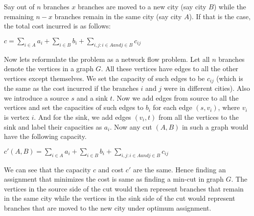 Say out of $n$ branches $x$ branches are moved to a new city (say city $B$) while the remaining $n-x$ branches remain in the same city (say city $A$). If that is the case, the total cost incurred is as follows:

\begin{center}
$c = \sum\limits_{i \in A} a_i + \sum\limits_{i \in B} b_i + \sum\limits_{i, j: i \in A and j \in B} c_{ij} $
\end{center}


Now lets reformulate the problem as a network flow problem. Let all $n$ branches denote the vertices in a graph $G$. All these vertices have edges to all the other vertices except themselves. We set the capacity of such edges to be $c_{ij}$ (which is the same as the cost incurred if the branches $i$ and $j$ were in different cities). Also we introduce a source $s$ and a sink $t$. Now we add edges from source to all the vertices and set the capacities of such edges to $b_i$ for each edge $(s, v_i)$, where $v_i$ is vertex $i$. And for the sink, we add edges $(v_i,t)$ from all the vertices to the sink and label their capacities as $a_i$. Now any cut $(A, B)$ in such a graph would have the following capacity. 


\begin{center}
$c'(A, B) = \sum\limits_{i \in A} a_i + \sum\limits_{i \in B} b_i + \sum\limits_{i, j: i \in A and j \in B} c_{ij} $
\end{center}

We can see that the capacity $c$ and cost $c'$ are the same. Hence finding an assignment that minimizes the cost is same as finding a min-cut in graph $G$. The vertices in the source side of the cut would then represent branches that remain in the same city while the vertices in the sink side of the cut would represent branches that are moved to the new city under optimum assignment. 